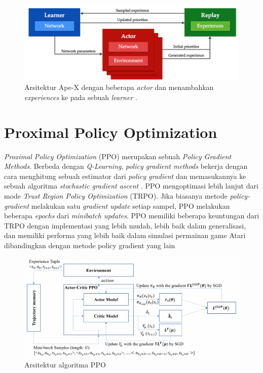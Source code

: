 \begin{figure}[H]
  \centering
    \includegraphics[scale=0.6]{gambar/apex1.png}
    \caption{Arsitektur Ape-X dengan beberapa \emph{actor} dan menambahkan \emph{experiences} ke pada sebuah \emph{learner} \citep{apexDQN}.}
    \label{fig:apexDQNArchitecture}
\end{figure}

\section{Proximal Policy Optimization}

\emph{Proximal Policy Optimization} (PPO) merupakan sebuah \emph{Policy Gradient Methods}. 
Berbeda dengan \emph{Q-Learning}, \emph{policy gradient methods} bekerja dengan cara menghitung sebuah estimator dari \emph{policy gradient} dan memasukannya ke
sebuah algoritma \emph{stochastic gradient ascent} \citep{ppo}. PPO mengoptimasi lebih lanjut dari mode \emph{Trust Region Policy Optimization} (TRPO).
Jika biasanya metode \emph{policy-gradient} melakukan satu \emph{gradient update} setiap sampel, PPO melakukan beberapa \emph{epochs} dari \emph{minibatch updates}. 
PPO memiliki beberapa keuntungan dari TRPO dengan implementasi yang lebih mudah, lebih baik dalam generalisasi, dan memiliki performa yang lebih baik dalam simulasi permainan game Atari dibandingkan dengan metode policy gradient yang lain

\begin{figure}[H]
  \centering
    \includegraphics[scale=0.6]{gambar/ppo_model.png}
    \caption{Arsitektur algoritma PPO}
    \label{fig:ppoArchitecture}
\end{figure}

